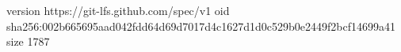 version https://git-lfs.github.com/spec/v1
oid sha256:002b665695aad042fdd64d69d7017d4c1627d1d0c529b0e2449f2bcf14699a41
size 1787
